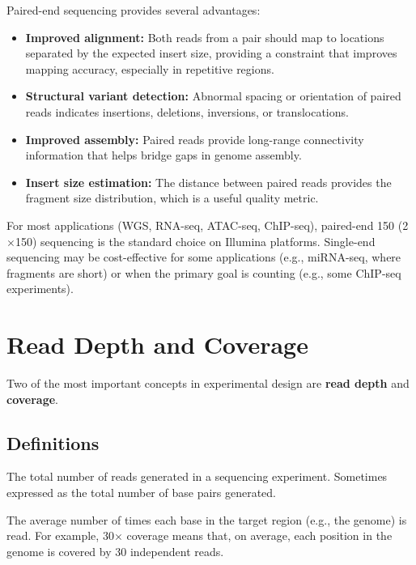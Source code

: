 Paired-end sequencing provides several advantages:
\begin{itemize}[itemsep=2pt]
  \item \textbf{Improved alignment:} Both reads from a pair should map to locations separated by the expected insert size, providing a constraint that improves mapping accuracy, especially in repetitive regions.
  \item \textbf{Structural variant detection:} Abnormal spacing or orientation of paired reads indicates insertions, deletions, inversions, or translocations.
  \item \textbf{Improved assembly:} Paired reads provide long-range connectivity information that helps bridge gaps in genome assembly.
  \item \textbf{Insert size estimation:} The distance between paired reads provides the fragment size distribution, which is a useful quality metric.
\end{itemize}

\begin{tipbox}
For most applications (WGS, RNA-seq, ATAC-seq, ChIP-seq), paired-end 150\basepair{} (2$\times$150) sequencing is the standard choice on Illumina platforms. Single-end sequencing may be cost-effective for some applications (e.g., miRNA-seq, where fragments are short) or when the primary goal is counting (e.g., some ChIP-seq experiments).
\end{tipbox}


\section{Read Depth and Coverage}
\label{sec:seqprinciples:coverage}

Two of the most important concepts in experimental design are \textbf{read depth} and \textbf{coverage}.

\subsection{Definitions}
\label{subsec:seqprinciples:coverage-def}

\begin{description}[style=nextline, itemsep=3pt]
  \item[Sequencing depth (read depth)] The total number of reads generated in a sequencing experiment. Sometimes expressed as the total number of base pairs generated.

  \item[Coverage (fold coverage, denoted $\times$)] The average number of times each base in the target region (e.g., the genome) is read. For example, 30$\times$ coverage means that, on average, each position in the genome is covered by 30 independent reads.
\end{description}


